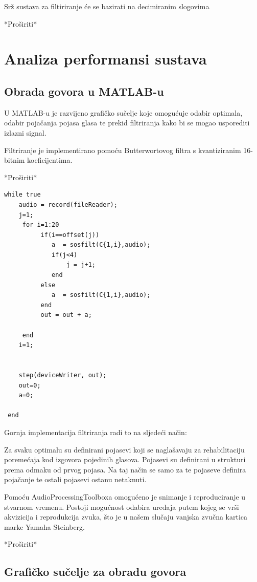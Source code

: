 \documentclass[times, utf8, diplomski]{fer}
\begin{document}
Srž sustava za filtiriranje će se bazirati na decimiranim slogovima

*Proširiti*
\citep{fbdha}



\chapter{Analiza performansi sustava}
\section{Obrada govora u MATLAB-u}
U MATLAB-u je razvijeno grafičko sučelje koje omogućuje odabir optimala, odabir pojačanja pojasa glasa te prekid filtriranja kako bi se mogao usporediti izlazni signal.

Filtriranje je implementirano pomoću Butterwortovog filtra s kvantiziranim 16-bitnim koeficijentima.

*Proširiti*

\begin{lstlisting} 
while true
    audio = record(fileReader);
    j=1;
     for i=1:20
          if(i==offset(j))
             a  = sosfilt(C{1,i},audio); 
             if(j<4)
                 j = j+1;
             end
          else
             a  = sosfilt(C{1,i},audio);
          end
          out = out + a;

     end
    i=1;

    
    step(deviceWriter, out);
    out=0;
    a=0;

 end
\end{lstlisting}

Gornja implementacija filtriranja radi to na sljedeći način:

Za svaku optimalu su definirani pojasevi koji se naglašavaju za rehabilitaciju poremećaja kod izgovora pojedinih glasova. Pojasevi su definirani u strukturi prema odmaku od prvog pojasa. Na taj način se samo za te pojaseve definira pojačanje te ostali pojasevi ostanu netaknuti.


Pomoću AudioProcessingToolboxa omogućeno je snimanje i reproduciranje u stvarnom vremenu. Postoji mogućnost odabira uređaja putem kojeg se vrši akvizicija i reprodukcija zvuka, što je u našem slučaju vanjska zvučna kartica marke Yamaha Steinberg.

*Proširiti*

\section{Grafičko sučelje za obradu govora}
\end{document}
